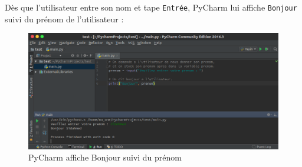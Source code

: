 \documentclass[12pt]{article}
\newcommand{\code}[1]{\colorbox{light-gray}{\texttt{#1}}}
\begin{document}
            Dès que l'utilisateur entre son nom et tape \code{Entrée}, PyCharm lui affiche \code{Bonjour} suivi 
            du prénom de l'utilisateur :
            \begin{figure}[H]
                \centering
                \includegraphics[width=\linewidth]{img/17_input.png}
                \caption{PyCharm affiche Bonjour suivi du prénom}
            \end{figure}
\end{document}
